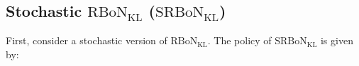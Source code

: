 \subsection{Stochastic $\mathrm{RBoN}_{\mathrm{KL}}$ ($\mathrm{SRBoN}_{\mathrm{KL}}$)}\label{propose:kl}
First, consider a stochastic version of $\mathrm{RBoN}_{\mathrm{KL}}$.
The policy of $\mathrm{SRBoN}_{\mathrm{KL}}$ is given by:

